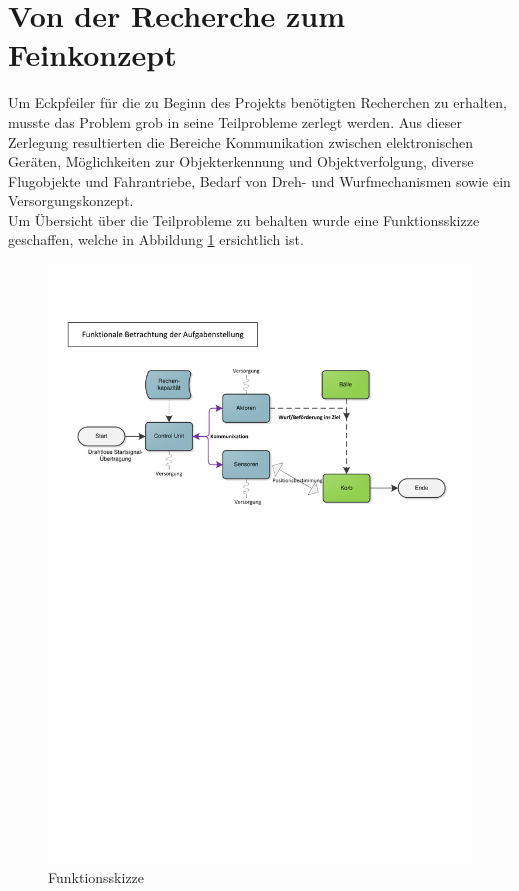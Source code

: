 \section{Von der Recherche zum Feinkonzept}
Um Eckpfeiler für die zu Beginn des Projekts benötigten Recherchen zu erhalten, musste das
Problem grob in seine Teilprobleme zerlegt werden. Aus dieser Zerlegung resultierten die
Bereiche Kommunikation zwischen elektronischen Geräten, Möglichkeiten zur Objekterkennung und
Objektverfolgung, diverse Flugobjekte und Fahrantriebe, Bedarf von Dreh- und Wurfmechanismen
sowie ein Versorgungskonzept. \\
Um Übersicht über die Teilprobleme zu behalten wurde eine Funktionsskizze geschaffen, welche
in  Abbildung \ref{fig:Funktionsskizze} ersichtlich ist.\\
\begin{figure}[h!]
	\centering
	\includegraphics[width=.9\textwidth,clip,trim= 14mm 17.8cm 12mm 50mm]
	{Enddokumentation/Varianten/Bilder/Funktionsskizze.pdf}
	\caption{Funktionsskizze}
	\label{fig:Funktionsskizze}
\end{figure}
